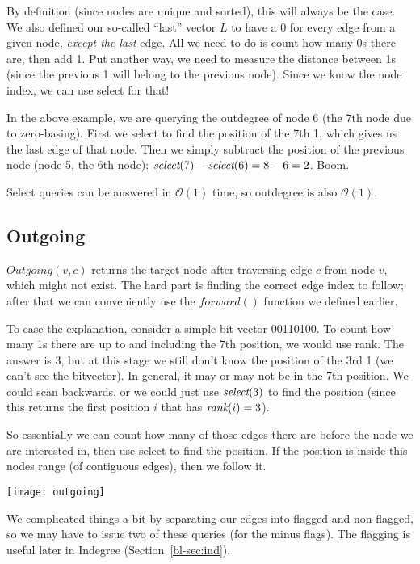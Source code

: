 By definition (since nodes are unique and sorted), this will always be the case. We also defined our so-called ``last'' vector $L$ to have a 0 for every edge from a given node, \emph{except the last} edge. All we need to do is count how many 0s there are, then add 1. Put another way, we need to measure the distance between 1s (since the previous 1 will belong to the previous node). Since we know the node index, we can use select for that!

In the above example, we are querying the outdegree of node 6 (the 7th node due to zero-basing). First we select to find the position of the 7th 1, which gives us the last edge of that node. Then we simply subtract the position of the previous node (node 5, the 6th node): 
$\textit{select}(7)-\textit{select}(6)=8-6=2$. Boom.

Select queries can be answered in $\mathcal{O}(1)$ time, so outdegree is also $\mathcal{O}(1)$.

\subsection{Outgoing}\label{bl-sec:outg}

$\textit{Outgoing}(v,c)$ returns the target node after traversing edge $c$ from node $v$, which might not exist. The hard part is finding the correct edge index to follow; after that we can conveniently use the $\textit{forward}()$ function we defined earlier.

To ease the explanation, consider a simple bit vector 00110100. To count how many 1s there are up to and including the 7th position, we would use rank. The answer is 3, but at this stage we still don't know the position of the 3rd 1 (we can't see the bitvector). In general, it may or may not be in the 7th position. We could scan backwards, or we could just use $\textit{select}(3)$ to find the position (since this returns the first position $i$ that has $\textit{rank}(i) = 3$).

So essentially we can count how many of those edges there are before the node we are interested in, then use select to find the position. If the position is inside this nodes range (of contiguous edges), then we follow it.

\medskip\centerline{\texttt{[image: outgoing]}}\medskip

We complicated things a bit by separating our edges into flagged and non-flagged, so we may have to issue two of these queries (for the minus flags). The flagging is useful later in Indegree (Section~\ref{bl-sec:ind}).

